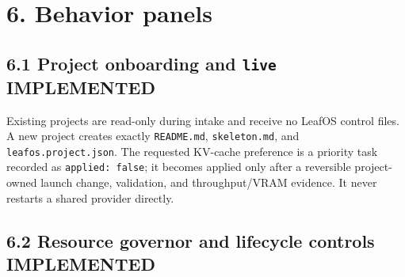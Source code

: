 \documentclass[11pt,a4paper]{article}
\newcommand{\pathcode}[1]{\texttt{#1}}
\newcommand{\role}[2]{\textcolor{#1}{\textbf{#2}}}
\begin{document}
\section*{6. Behavior panels}

\subsection*{6.1 Project onboarding and \pathcode{live} \hfill \role{leafgreen}{IMPLEMENTED}}

\begin{center}
\end{center}

Existing projects are read-only during intake and receive no LeafOS control
files. A new project creates exactly \pathcode{README.md}, \pathcode{skeleton.md},
and \pathcode{leafos.project.json}. The requested KV-cache preference is a
priority task recorded as \pathcode{applied: false}; it becomes applied only
after a reversible project-owned launch change, validation, and throughput/VRAM
evidence. It never restarts a shared provider directly.

\subsection*{6.2 Resource governor and lifecycle controls \hfill \role{leafgreen}{IMPLEMENTED}}
\end{document}
